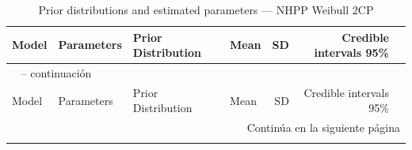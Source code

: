 \begin{longtable}{llllrrr}
\caption{Prior distributions and estimated parameters --- NHPP Weibull 2CP} \label{tab:nhpp_params_2cp} \\
\toprule
Model & Parameters & Prior Distribution & Mean & SD & Credible intervals 95\% \\
\midrule
\endfirsthead

\multicolumn{7}{l}{\tablename\ \thetable{} -- continuaci\'{o}n} \\
\toprule
Model & Parameters & Prior Distribution & Mean & SD & Credible intervals 95\% \\
\midrule
\endhead

\midrule
\multicolumn{7}{r}{Contin\'{u}a en la siguiente p\'{a}gina} \\
\endfoot

\bottomrule
\endlastfoot


\end{longtable}
